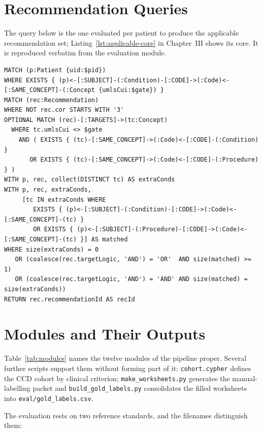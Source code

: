 \section{Recommendation Queries}
\label{app:queries}
The query below is the one evaluated per patient to produce the applicable
recommendation set; Listing~\ref{lst:applicable-core} in Chapter~III shows its
core. It is reproduced verbatim from the evaluation module.

\begin{lstlisting}[caption={Applicable recommendations for one patient.},label={lst:applicable-full}]
MATCH (p:Patient {uid:$pid})
WHERE EXISTS { (p)<-[:SUBJECT]-(:Condition)-[:CODE]->(:Code)<-[:SAME_CONCEPT]-(:Concept {umlsCui:$gate}) }
MATCH (rec:Recommendation)
WHERE NOT rec.cor STARTS WITH '3'
OPTIONAL MATCH (rec)-[:TARGETS]->(tc:Concept)
  WHERE tc.umlsCui <> $gate
    AND ( EXISTS { (tc)-[:SAME_CONCEPT]->(:Code)<-[:CODE]-(:Condition) }
       OR EXISTS { (tc)-[:SAME_CONCEPT]->(:Code)<-[:CODE]-(:Procedure) } )
WITH p, rec, collect(DISTINCT tc) AS extraConds
WITH p, rec, extraConds,
     [tc IN extraConds WHERE
        EXISTS { (p)<-[:SUBJECT]-(:Condition)-[:CODE]->(:Code)<-[:SAME_CONCEPT]-(tc) }
        OR EXISTS { (p)<-[:SUBJECT]-(:Procedure)-[:CODE]->(:Code)<-[:SAME_CONCEPT]-(tc) }] AS matched
WHERE size(extraConds) = 0
   OR (coalesce(rec.targetLogic, 'AND') = 'OR'  AND size(matched) >= 1)
   OR (coalesce(rec.targetLogic, 'AND') = 'AND' AND size(matched) = size(extraConds))
RETURN rec.recommendationId AS recId
\end{lstlisting}

\section{Modules and Their Outputs}
\label{app:modules}
Table~\ref{tab:modules} names the twelve modules of the pipeline proper. Several further
scripts support them without forming part of it: \texttt{cohort.cypher} defines the CCD
cohort by clinical criterion; \texttt{make\_worksheets.py} generates the manual-labelling
packet and \texttt{build\_gold\_labels.py} consolidates the filled worksheets into
\texttt{eval/gold\_labels.csv}.

The evaluation rests on two reference standards, and the filenames distinguish them:

